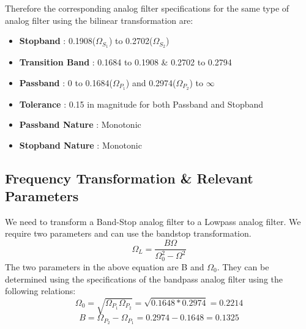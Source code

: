 \documentclass[12pt]{article}
\begin{document}
Therefore the corresponding analog filter specifications for the same type of analog filter using the bilinear transformation are:
\begin{itemize}
\item \textbf{Stopband} : 0.1908($\Omega _{S_{1}}$) to 0.2702($\Omega _{S_{2}}$)
\item \textbf{Transition Band} : 0.1684 to  0.1908 \& 0.2702 to 0.2794
\item \textbf{Passband} : 0 to 0.1684($\Omega _{P_{1}}$) and 0.2974($\Omega _{P_{2}}$) to $\infty$
\item \textbf{Tolerance} : 0.15 in magnitude for both Passband and Stopband
\item \textbf{Passband Nature} : Monotonic
\item \textbf{Stopband Nature} : Monotonic
\end{itemize}
\subsection{Frequency Transformation \& Relevant Parameters}
We need to transform a Band-Stop analog filter to a Lowpass analog filter. We require two parameters and can use the bandstop transformation. \\
\begin{equation*}
\Omega _{L} = \frac{B\Omega}{\Omega _{0}^{2} - \Omega^{2}}
\end{equation*}
The two parameters in the above equation are B and $\Omega _{0}$. They can be determined using the specifications of the bandpass analog filter using the following relations:\\
\begin{equation*}
\Omega _{0} = \sqrt{\Omega _{P_{1}}\Omega _{P_{2}}} = \sqrt{0.1648 * 0.2974} = 0.2214
\end{equation*}
\begin{equation*}
B = \Omega _{P_{2}} - \Omega _{P_{1}} = 0.2974 - 0.1648 = 0.1325
\end{equation*}
\end{document}
